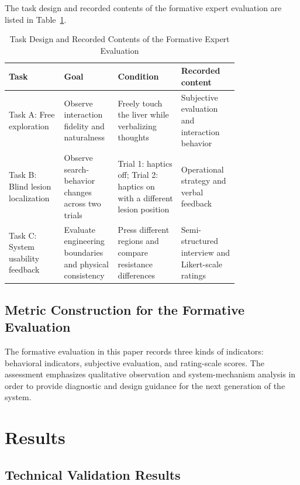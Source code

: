 \documentclass{ieeeaccess}
\begin{document}
The task design and recorded contents of the formative expert evaluation are listed in Table~\ref{tab:tasks}.

\begin{table}[htbp]
\caption{Task Design and Recorded Contents of the Formative Expert Evaluation}
\label{tab:tasks}
\centering
\scriptsize
\renewcommand{\arraystretch}{1.15}
\setlength{\tabcolsep}{3pt}
\begin{tabular}{|p{0.19\linewidth}|p{0.15\linewidth}|p{0.24\linewidth}|p{0.20\linewidth}|}
\hline
Task & Goal & Condition & Recorded content \\
\hline
Task A: Free exploration & Observe interaction fidelity and naturalness & Freely touch the liver while verbalizing thoughts & Subjective evaluation and interaction behavior \\
\hline
Task B: Blind lesion localization & Observe search-behavior changes across two trials & Trial 1: haptics off; Trial 2: haptics on with a different lesion position & Operational strategy and verbal feedback \\
\hline
Task C: System usability feedback & Evaluate engineering boundaries and physical consistency & Press different regions and compare resistance differences & Semi-structured interview and Likert-scale ratings \\
\hline
\end{tabular}
\end{table}

\subsection{Metric Construction for the Formative Evaluation}
The formative evaluation in this paper records three kinds of indicators: behavioral indicators, subjective evaluation, and rating-scale scores. The assessment emphasizes qualitative observation and system-mechanism analysis in order to provide diagnostic and design guidance for the next generation of the system.

\section{Results}

\subsection{Technical Validation Results}
\end{document}
